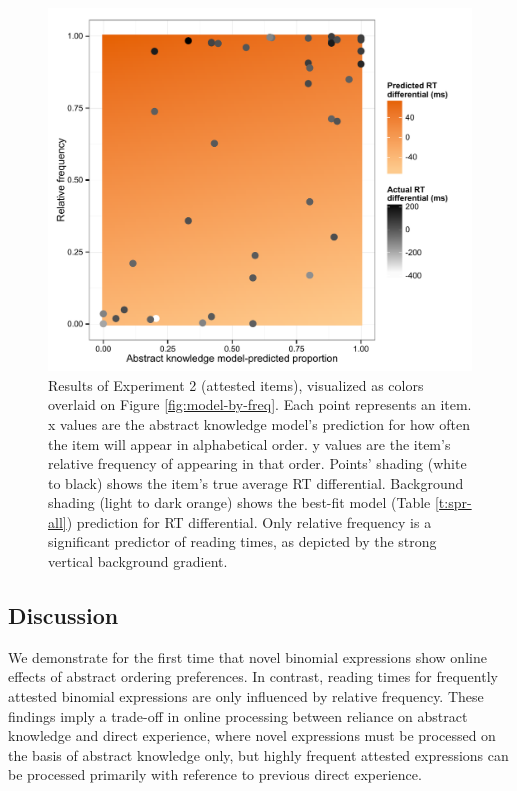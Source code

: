 \documentclass[authoryear]{elsarticle}
\begin{document}
\begin{figure}[t]
\includegraphics[scale=0.7]{spr-attested.pdf}
\caption{Results of Experiment 2 (attested items), visualized as colors overlaid on Figure \ref{fig:model-by-freq}. Each point represents an item. x values are the abstract knowledge model's prediction for how often the item will appear in alphabetical order. y values are the item's relative frequency of appearing in that order. Points' shading (white to black) shows the item's true average RT differential. Background shading (light to dark orange) shows the best-fit model (Table \ref{t:spr-all}) prediction for RT differential. Only relative frequency is a significant predictor of reading times, as depicted by the strong vertical background gradient.} \label{fig:spr-freq}
\end{figure}

\subsection{Discussion}\label{exp2-dis}
We demonstrate for the first time that novel binomial expressions show online effects of abstract ordering preferences. In contrast, reading times for frequently attested binomial expressions are only influenced by relative frequency. These findings imply a trade-off in online processing between reliance on abstract knowledge and direct experience, where novel expressions must be processed on the basis of abstract knowledge only, but highly frequent attested expressions can be processed primarily with reference to previous direct experience.
\end{document}
